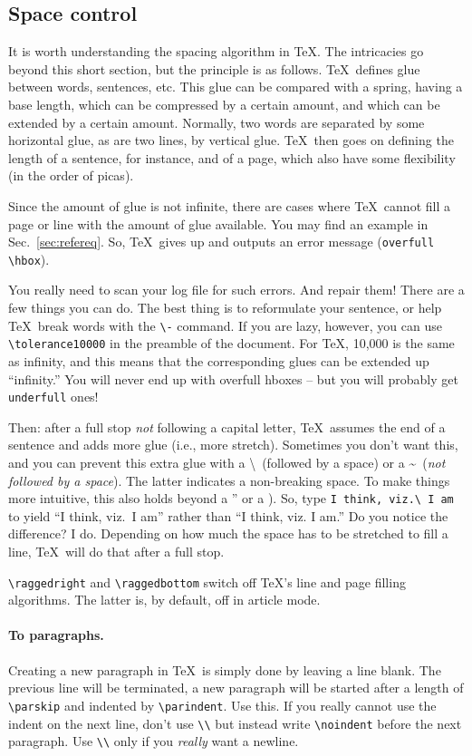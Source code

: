 \documentclass{article}
\begin{document}
\subsection{Space control}
It is worth understanding the spacing algorithm in \TeX. The intricacies go beyond this short section, but the principle is as follows.  \TeX\ defines glue between words, sentences, etc.  This glue can be compared with a spring, having a base length, which can be compressed by a certain amount, and which can be extended by a certain amount.  Normally, two words are separated by some  horizontal glue, as are two lines, by vertical glue.  \TeX\ then goes on defining the length of a sentence, for instance, and of a page, which also have some flexibility (in the order of picas).

Since the amount of glue is not infinite, there are cases where \TeX\ cannot fill a page or line with the amount of glue available.  You may find an example in Sec.~\ref{sec:refereq}.  So, \TeX\ gives up and outputs an error message (\verb+overfull \hbox+).

You really need to scan your log file for such errors.  And repair them!  There are a few things you can do.  The best thing is to reformulate your sentence, or help \TeX\ break words with the \verb+\-+ command.  If you are lazy, however, you can use \verb+\tolerance10000+ in the preamble of the document.  For \TeX, 10,000 is the same as infinity, and this means that the corresponding glues can be extended up ``infinity.''  You will never end up with overfull hboxes -- but you will probably get \verb+underfull+ ones!

Then: after a full stop \textsl{not} following a capital letter, \TeX\ assumes the end of a sentence and adds more glue (i.e., more stretch).  Sometimes you don't want this, and you can prevent this extra glue with a \textbackslash\ (followed by a space) or a \textasciitilde\ (\textsl{not followed by a space}). The latter indicates a non-breaking space. To make things more intuitive, this also holds beyond a '' or a ).  So, type \verb+I think, viz.\ I am+ to yield ``I think, viz.\ I am'' rather than ``I think, viz. I am.'' Do you notice the difference?  I do.  Depending on how much the space has to be stretched to fill a line, \TeX\ will do that after a full stop.


\verb+\raggedright+ and \verb+\raggedbottom+ switch off \TeX's line and page filling algorithms. The latter is, by default, off in article mode.


\paragraph{To paragraphs.}
Creating a new paragraph in \TeX\ is simply done by leaving a line blank. The previous line will be terminated, a new paragraph will be started after a  length of \verb+\parskip+ and indented by \verb+\parindent+.  Use this.  If you really cannot use the indent on the next line, don't use \verb+\\+ but instead write  \verb+\noindent+ before the next paragraph.  Use \verb+\\+ only if you \textsl{really} want a newline.
\end{document}
